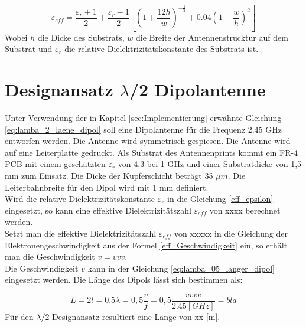 \begin{equation}\label{eff_epsilon}
\varepsilon_{eff}=\dfrac{\varepsilon_r+1}{2}+\dfrac{\varepsilon_r-1}{2}\left[\left(1+\dfrac{12h}{w}\right)^{-\frac{1}{2}}+0.04\left(1-\dfrac{w}{h}\right)^{2}\right]
\end{equation}
Wobei $h$ die Dicke des Substrats, $w$ die Breite der Antennenstrucktur auf dem Substrat und  $\varepsilon_{r}$ die relative Dielektrizitätskonstante des Substrats ist. 

\section{Designansatz $\lambda$/2 Dipolantenne}  
Unter Verwendung der in Kapitel \ref{sec:Implementierung} erwähnte Gleichung \ref{eq:lamba_2_laene_dipol} soll eine Dipolantenne für die Frequenz 2.45 GHz entworfen werden. Die Antenne wird symmetrisch gespiesen. Die Antenne wird auf eine Leiterplatte gedruckt. Als Substrat des Antennenprints kommt ein  FR-4 PCB mit einem geschätzten  $\varepsilon_r $ von 4.3 bei 1 GHz und einer Substratdicke von 1,5 mm  zum Einsatz. Die Dicke der Kupferschicht beträgt 35 $\mu m$. Die Leiterbahnbreite für den Dipol wird mit 1 mm  definiert.\\

Wird die relative Dielektrizitätskonstante $\varepsilon_{r}$ in die Gleichung \ref{eff_epsilon} eingesetzt, so kann eine effektive Dielektrizitätszahl $\varepsilon_{eff}$  von xxxx berechnet werden.\\

Setzt man die effektive Dielektrizitätszahl $\varepsilon_{eff}$ von xxxxx  in die Gleichung der Elektronengeschwindigkeit aus der Formel \ref{eff_Geschwindigkeit} ein, so erhält man die Geschwindigkeit $v=vvv$. \\
Die Geschwindigkeit $v$  kann in der  Gleichung \ref{eq:lamba_05_langer_dipol} eingesetzt werden. Die Länge des Dipols lässt sich bestimmen als:

\begin{equation}\label{eq:lamba_05_langer_dipol}
L=2l = 0.5 \lambda= 0,5\dfrac{v}{f}=0,5 \dfrac{vvvv}{2.45[GHz]}=bla
\end{equation} 
Für den $\lambda/2$ Designansatz resultiert eine Länge von xx [m].
